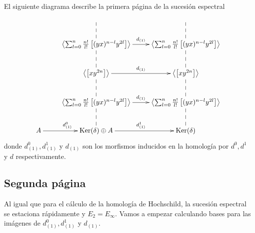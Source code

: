 \documentclass[fleqn,../tesis.tex]{subfiles}
\begin{document}
El siguiente diagrama describe la primera página de la sucesión espectral
\begin{align*}
\xymatrix{
	& & \\
	& \left\langle \sum_{l = 0}^{n}\frac{n!}{l!}\left[(yx)^{n - l}y^{2l}\right] \right\rangle \ar[r]^{d_{(1)}} \ar@{--}[u]
	    & \left\langle \sum_{l = 0}^{n}\frac{n!}{l!}\left[(yx)^{n - l}y^{2l}\right] \right\rangle \ar@{--}[u] \\
    & \left\langle \left[xy^{2n}\right] \right\rangle \ar@{--}[u] \ar[r]^{d_{(1)}} & \left\langle \left[xy^{2n}\right] \right\rangle \ar@{--}[u] \\
    & \left\langle \sum_{l = 0}^{n}\frac{n!}{l!}\left[(yx)^{n - l}y^{2l}\right] \right\rangle \ar[r]^{d_{(1)}} \ar@{--}[u]
	    & \left\langle \sum_{l = 0}^{n}\frac{n!}{l!}\left[(yx)^{n - l}y^{2l}\right] \right\rangle \ar@{--}[u] \\ 
    A \ar[r]^{d^{0}_{(1)}} & \Ker(\delta) \oplus A \ar[r]^{d^{1}_{(1)}} \ar@{--}[u] & \Ker(\delta) \ar@{--}[u]
} 
\end{align*}
donde $d^{0}_{(1)}, d^{1}_{(1)}$ y $d_{(1)}$ son los morfismos inducidos en la homología por $d^{0}, d^{1}$ y $d$ respectivamente.

\subsection{Segunda página}
Al igual que para el cálculo de la homología de Hochschild, la sucesión espectral se estaciona rápidamente y $E_{2} = E_{\infty}$.
Vamos a empezar calculando bases para las imágenes de $d^{0}_{(1)}, d^{1}_{(1)}$ y $d_{(1)}$.
\end{document}
